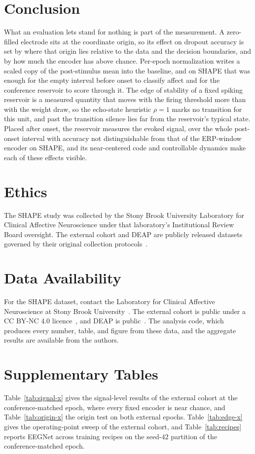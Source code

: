 \documentclass[journal]{IEEEtran}
\begin{document}
\section{Conclusion}
What an evaluation lets stand for nothing is part of the measurement. A zero-filled electrode sits at the coordinate origin, so its effect on dropout accuracy is set by where that origin lies relative to the data and the decision boundaries, and by how much the encoder has above chance. Per-epoch normalization writes a scaled copy of the post-stimulus mean into the baseline, and on SHAPE that was enough for the empty interval before onset to classify affect and for the conference reservoir to score through it. The edge of stability of a fixed spiking reservoir is a measured quantity that moves with the firing threshold more than with the weight draw, so the echo-state heuristic $\rho=1$ marks no transition for this unit, and past the transition silence lies far from the reservoir's typical state. Placed after onset, the reservoir measures the evoked signal, over the whole post-onset interval with accuracy not distinguishable from that of the ERP-window encoder on SHAPE, and its near-centered code and controllable dynamics make each of these effects visible.

\section*{Ethics}
The SHAPE study was collected by the Stony Brook University Laboratory for Clinical Affective Neuroscience under that laboratory's Institutional Review Board oversight. The external cohort and DEAP are publicly released datasets governed by their original collection protocols~\cite{revers2025dissociating,tcrzem2025data,koelstra2012deap}.

\section*{Data Availability}
For the SHAPE dataset, contact the Laboratory for Clinical Affective Neuroscience at Stony Brook University~\cite{shape}. The external cohort is public under a CC BY-NC 4.0 licence~\cite{tcrzem2025data}, and DEAP is public~\cite{koelstra2012deap}. The analysis code, which produces every number, table, and figure from these data, and the aggregate results are available from the authors.



\appendices
\section{Supplementary Tables}
\label{app:supp}
Table~\ref{tab:signal-x} gives the signal-level results of the external cohort at the conference-matched epoch, where every fixed encoder is near chance, and Table~\ref{tab:origin-x} the origin test on both external epochs. Table~\ref{tab:edge-x} gives the operating-point sweep of the external cohort, and Table~\ref{tab:recipes} reports EEGNet across training recipes on the seed-$42$ partition of the conference-matched epoch.
\end{document}
